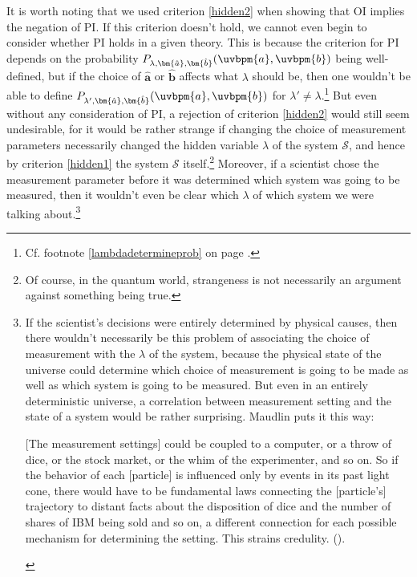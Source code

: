 \documentclass[12pt]{report}
\begin{document}
It is worth noting that  we used criterion \ref{hidden2} when showing that OI implies the negation of PI. If this criterion doesn't hold, we cannot even begin to consider whether PI holds in a given theory. This is because the criterion for PI depends on the probability $P_{\lambda,\bm{\hat{a}},\bm{\hat{b}}}(\uvbpm{a},\uvbpm{b})$ being well-defined, but if the choice of $\bm{\hat{a}}$ or $\bm{\hat{b}}$ affects  what $\lambda$ should be, then one wouldn't be able to define $P_{\lambda',\bm{\hat{a}},\bm{\hat{b}}}(\uvbpm{a},\uvbpm{b})$ for $\lambda'\neq\lambda$.\footnote{Cf. footnote \ref{lambdadetermineprob} on page \pageref{lambdadetermineprob}.} But even without any consideration of PI, a rejection of criterion \ref{hidden2} would still seem undesirable, for it would be rather strange if changing the choice of measurement parameters necessarily changed the hidden variable $\lambda$ of the system $\mathcal{S}$, and hence by criterion \ref{hidden1} the system $\mathcal{S}$ itself.\footnote{Of course, in the quantum world, strangeness is not necessarily an argument against something being true.} Moreover, if a scientist chose the measurement parameter before it was determined which system was going to be measured, then it wouldn't even be clear which $\lambda$ of which system we were talking about.\footnote{If the scientist's decisions were entirely determined by physical causes, then there wouldn't necessarily be this problem of associating the choice of measurement with the $\lambda$ of the system, because the physical state of the universe could determine which choice of measurement is going to be made as well as which system is going to be measured. But even in an entirely deterministic universe, a correlation between measurement setting and the state of a system would be rather surprising. Maudlin puts it this way:
\begin{adjustwidth}{1cm}{}
	\begin{displayquote}
		$[$The measurement settings$]$ could be coupled to a computer, or a throw of dice, or the stock market, or the whim of the experimenter, and so on. So if the behavior of each [particle] 
		is influenced only by events in its past light cone, there would have to be fundamental laws connecting the [particle's] trajectory to distant facts about the disposition of dice and the number of shares of IBM being sold and so on, a different connection for each possible mechanism for determining the setting. This strains credulity. (\cite[57]{MaudlinTim2011Q}).
	\end{displayquote}
\end{adjustwidth}
}  
\end{document}
